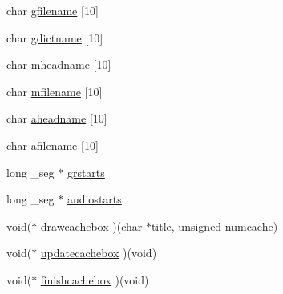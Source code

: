 \begin{DoxyCompactItemize}
\item 
char \hyperlink{ID__CA_8H_a7c0f9e79b593ea1e4b4c11eb3f453441}{gfilename} \mbox{[}10\mbox{]}
\item 
char \hyperlink{ID__CA_8H_a33eb86aadf8d284b465028ee5c9fbbc0}{gdictname} \mbox{[}10\mbox{]}
\item 
char \hyperlink{ID__CA_8H_ad22a6c11e49c368ace6f3aca1057b21d}{mheadname} \mbox{[}10\mbox{]}
\item 
char \hyperlink{ID__CA_8H_aed11d164b12fd19ca11fee978f42673d}{mfilename} \mbox{[}10\mbox{]}
\item 
char \hyperlink{ID__CA_8H_ae27bc3abca3350509677eede2aa0f32a}{aheadname} \mbox{[}10\mbox{]}
\item 
char \hyperlink{ID__CA_8H_ac7fd0efffc3b41d475ede3556547646a}{afilename} \mbox{[}10\mbox{]}
\item 
long \_\-seg $\ast$ \hyperlink{ID__CA_8H_a9a8af7c3aff26b9be0edd764efef3bba}{grstarts}
\item 
long \_\-seg $\ast$ \hyperlink{ID__CA_8H_aca24eee9c13114cc6f73c094c7eb9379}{audiostarts}
\item 
void($\ast$ \hyperlink{ID__CA_8H_a95b0b2bbc1e3355c0a461efd1f569217}{drawcachebox} )(char $\ast$title, unsigned numcache)
\item 
void($\ast$ \hyperlink{ID__CA_8H_a812a200aab0e9dfa52a50dea46f14da1}{updatecachebox} )(void)
\item 
void($\ast$ \hyperlink{ID__CA_8H_a0271eb601c69c0069697e3795a429ed6}{finishcachebox} )(void)
\end{DoxyCompactItemize}


